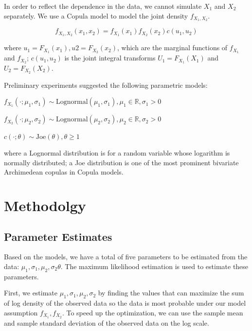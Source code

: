 \documentclass[11pt,]{article}
\begin{document}
In order to reflect the dependence in the data, we cannot simulate
\(X_1\) and \(X_2\) separately. We use a Copula model to model the joint
density \(f_{X_{1}, X_{2}}\).

\[
f_{X_{1}, X_{2}}\left(x_{1}, x_{2}\right)=f_{X_{1}}\left(x_{1}\right) f_{X_{2}}\left(x_{2}\right) c\left(u_1,u_2\right)
\]

where
\(u_1 = F_{X_{1}}\left(x_{1}\right),u2= F_{X_{2}}\left(x_{2}\right)\),
which are the marginal functions of \(f_{X_{1}}\) and \(f_{X_{2}}\);
\(c\left(u_{1}, u_{2}\right)\) is the joint integral transforms
\(U_{1}=F_{X_{1}}\left(X_{1}\right)\) and
\(U_{2}=F_{X_{2}}\left(X_{2}\right)\).

Preliminary experiments suggested the following parametric models:

\(f_{X_{1}}\left(\cdot ; \mu_{1}, \sigma_{1}\right) \sim \textrm{Lognormal} \left(\mu_{1}, \sigma_{1}\right), \mu_{1} \in \mathbb{R}, \sigma_{1}>0\)

\(f_{X_{2}}\left(\cdot ; \mu_{2}, \sigma_{2}\right) \sim \textrm{Lognormal} \left(\mu_{2}, \sigma_{2}\right), \mu_{2} \in \mathbb{R}, \sigma_{2}>0\)

\(c(\cdot ; \theta) \sim \textrm{Joe}(\theta), \theta \geq 1\)

where a Lognormal distribution is for a random variable whose logarithm
is normally distributed; a Joe distribution is one of the most prominent
bivariate Archimedean copulas in Copula models.

\hypertarget{methodolgy}{%
\section{Methodolgy}\label{methodolgy}}

\hypertarget{parameter-estimates}{%
\subsection{Parameter Estimates}\label{parameter-estimates}}

Based on the models, we have a total of five parameters to be estimated
from the data: \(\mu_{1},\sigma_{1},\mu_{2},\sigma_{2}\theta\). The
maximum likelihood estimation is used to estimate these parameters.

First, we estimate \(\mu_{1},\sigma_{1},\mu_{2},\sigma_{2}\) by finding
the values that can maximize the sum of log density of the observed data
so the data is most probable under our model assumption
\(f_{X_{1}},f_{X_{2}}\). To speed up the optimization, we can use the
sample mean and sample standard deviation of the observed data on the
log scale.
\end{document}
